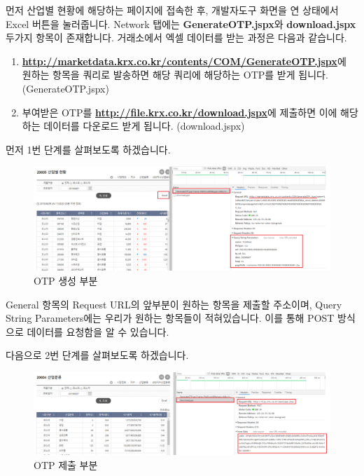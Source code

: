 \documentclass[12pt,]{book}
\begin{document}
먼저 산업별 현황에 해당하는 페이지에 접속한 후, 개발자도구 화면을 연 상태에서 Excel 버튼을 눌러줍니다. Network 탭에는 \textbf{GenerateOTP.jspx}와 \textbf{download.jspx} 두가지 항목이 존재합니다. 거래소에서 엑셀 데이터를 받는 과정은 다음과 같습니다.

\begin{enumerate}
\def\labelenumi{\arabic{enumi}.}
\item
  \textbf{\url{http://marketdata.krx.co.kr/contents/COM/GenerateOTP.jspx}}에 원하는 항목을 쿼리로 발송하면 해당 쿼리에 해당하는 OTP를 받게 됩니다. (GenerateOTP.jspx)
\item
  부여받은 OTP를 \textbf{\url{http://file.krx.co.kr/download.jspx}}에 제출하면 이에 해당하는 데이터를 다운로드 받게 됩니다. (download.jspx)
\end{enumerate}

먼저 1번 단계를 살펴보도록 하겠습니다.

\begin{figure}[h]

{\centering \includegraphics[width=1\linewidth]{images/crawl_practice_krx_sector} 

}

\caption{OTP 생성 부분}\label{fig:unnamed-chunk-2}
\end{figure}

General 항목의 Request URL의 앞부분이 원하는 항목을 제출할 주소이며, Query String Parameters에는 우리가 원하는 항목들이 적혀있습니다. 이를 통해 POST 방식으로 데이터를 요청함을 알 수 있습니다.

다음으로 2번 단계를 살펴보도록 하겠습니다.

\begin{figure}[h]

{\centering \includegraphics[width=1\linewidth]{images/crawl_practice_krx_sector2} 

}

\caption{OTP 제출 부분}\label{fig:unnamed-chunk-3}
\end{figure}
\end{document}
